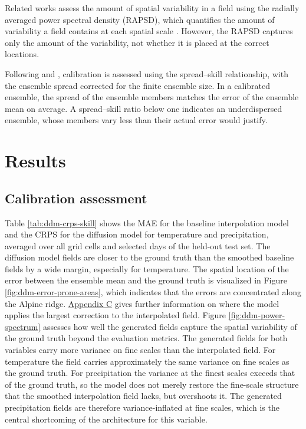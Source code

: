 \documentclass[
]{krantz}
\begin{document}
Related works assess the amount of spatial variability in a field using the radially averaged power spectral density (RAPSD), which quantifies the amount of variability a field contains at each spatial scale \citep{addison2026, tomasi2025}.
However, the RAPSD captures only the amount of the variability, not whether it is placed at the correct locations.

Following \citet{mardani2025} and \citet{addison2026}, calibration is assessed using the spread--skill relationship, with the ensemble spread corrected for the finite ensemble size. In a calibrated ensemble, the spread of the ensemble members matches the error of the ensemble mean on average. A spread--skill ratio below one indicates an underdispersed ensemble,
whose members vary less than their actual error would justify.

\section{Results}\label{results-1}

\subsection{Calibration assessment}\label{ddm-calibration-assessment}

Table \ref{tab:ddm-crps-skill} shows the MAE for the baseline interpolation model and the CRPS for the diffusion model for temperature and precipitation,
averaged over all grid cells and selected days of the held-out test set. The diffusion model fields are closer to the ground truth than the
smoothed baseline fields by a wide margin, especially for temperature.
The spatial location of the error between the ensemble mean and the ground truth is visualized in Figure \ref{fig:ddm-error-prone-areas}, which indicates that the errors are concentrated along the Alpine ridge.
\hyperref[ddm-appendix-c]{Appendix C} gives further information on where the model applies the largest correction to the interpolated field.
Figure \ref{fig:ddm-power-spectrum} assesses how well the generated fields capture the spatial variability of the ground truth beyond the evaluation metrics.
The generated fields for both variables carry more variance on fine scales than the interpolated field. For temperature the field carries approximately the same variance on fine scales as the ground truth.
For precipitation the variance at the finest scales exceeds that of the ground truth, so the model does not merely restore the fine-scale structure that the smoothed interpolation field lacks,
but overshoots it. The generated precipitation fields are therefore variance-inflated at fine scales, which is the central shortcoming of the architecture for this variable.
\end{document}

